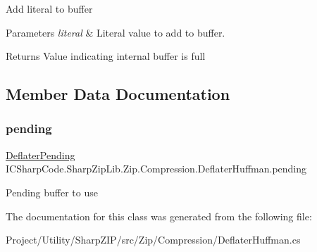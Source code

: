 Add literal to buffer 


\begin{DoxyParams}{Parameters}
{\em literal} & Literal value to add to buffer.\\
\hline
\end{DoxyParams}
\begin{DoxyReturn}{Returns}
Value indicating internal buffer is full
\end{DoxyReturn}


\subsection{Member Data Documentation}
\mbox{\label{class_i_c_sharp_code_1_1_sharp_zip_lib_1_1_zip_1_1_compression_1_1_deflater_huffman_ab905a4997487a36bab2c23abefa1d50a}} 
\subsubsection{\texorpdfstring{pending}{pending}}
{\footnotesize\ttfamily \hyperlink{class_i_c_sharp_code_1_1_sharp_zip_lib_1_1_zip_1_1_compression_1_1_deflater_pending}{Deflater\+Pending} I\+C\+Sharp\+Code.\+Sharp\+Zip\+Lib.\+Zip.\+Compression.\+Deflater\+Huffman.\+pending}



Pending buffer to use 



The documentation for this class was generated from the following file\+:\begin{DoxyCompactItemize}
\item 
Project/\+Utility/\+Sharp\+Z\+I\+P/src/\+Zip/\+Compression/Deflater\+Huffman.\+cs\end{DoxyCompactItemize}
